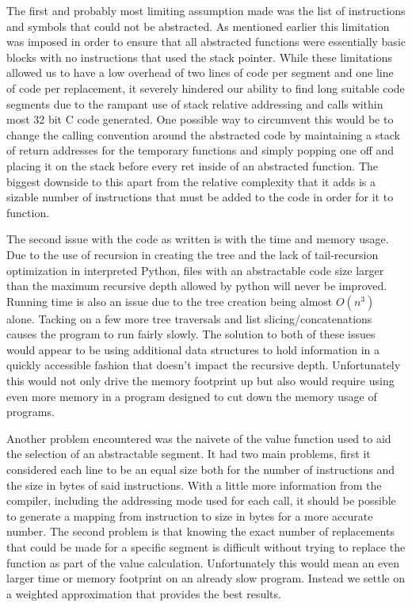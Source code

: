 \documentclass[9pt,nocopyrightspace]{sigplanconf}
\begin{document}
The first and probably most limiting assumption made was the list of instructions and symbols that could not be abstracted.
As mentioned earlier this limitation was imposed in order to ensure that all abstracted functions were essentially basic blocks with no instructions that used the stack pointer.
While these limitations allowed us to have a low overhead of two lines of code per segment and one line of code per replacement, it severely hindered our ability to find long suitable code segments due to the rampant use of stack relative addressing and calls within most 32 bit C code generated.
One possible way to circumvent this would be to change the calling convention around the abstracted code by maintaining a stack of return addresses for the temporary functions and simply popping one off and placing it on the stack before every ret inside of an abstracted function.
The biggest downside to this apart from the relative complexity that it adds is a sizable number of instructions that must be added to the code in order for it to function.

The second issue with the code as written is with the time and memory usage.
Due to the use of recursion in creating the tree and the lack of tail-recursion optimization in interpreted Python, files with an abstractable code size larger than the maximum recursive depth allowed by python will never be improved.
Running time is also an issue due to the tree creation being almost $O(n^{3})$ alone.
Tacking on a few more tree traversals and list slicing/concatenations causes the program to run fairly slowly.
The solution to both of these issues would appear to be using additional data structures to hold information in a quickly accessible fashion that doesn't impact the recursive depth.
Unfortunately this would not only drive the memory footprint up but also would require using even more memory in a program designed to cut down the memory usage of programs.

Another problem encountered was the naivete of the value function used to aid the selection of an abstractable segment.
It had two main problems, first it considered each line to be an equal size both for the number of instructions and the size in bytes of said instructions.
With a little more information from the compiler, including the addressing mode used for each call, it should be possible to generate a mapping from instruction to size in bytes for a more accurate number.
The second problem is that knowing the exact number of replacements that could be made for a specific segment is difficult without trying to replace the function as part of the value calculation.
Unfortunately this would mean an even larger time or memory footprint on an already slow program.
Instead we settle on a weighted approximation that provides the best results.
\end{document}
